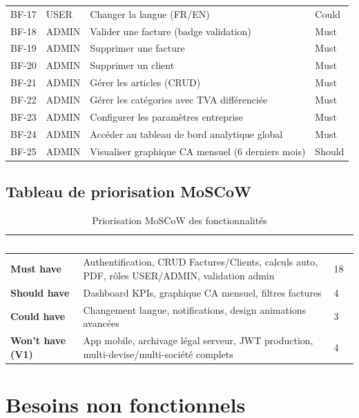 \documentclass[12pt,a4paper]{report}
\begin{document}
\begin{longtable}{|l|l|X|l|}
BF-17 & USER & Changer la langue (FR/EN) & Could \\
BF-18 & ADMIN & Valider une facture (badge validation) & Must \\
BF-19 & ADMIN & Supprimer une facture & Must \\
BF-20 & ADMIN & Supprimer un client & Must \\
BF-21 & ADMIN & Gérer les articles (CRUD) & Must \\
BF-22 & ADMIN & Gérer les catégories avec TVA différenciée & Must \\
BF-23 & ADMIN & Configurer les paramètres entreprise & Must \\
BF-24 & ADMIN & Accéder au tableau de bord analytique global & Must \\
BF-25 & ADMIN & Visualiser graphique CA mensuel (6 derniers mois) & Should \\
\hline
\end{longtable}

\subsection{Tableau de priorisation MoSCoW}

\begin{table}[H]
\centering
\caption{Priorisation MoSCoW des fonctionnalités}
\label{tab:moscow}
\begin{tabularx}{\textwidth}{|l|X|l|}
\hline
\rowcolor{emsiblue}\textcolor{white}{\textbf{Catégorie}} & \textcolor{white}{\textbf{Fonctionnalités}} & \textcolor{white}{\textbf{Nb}} \\
\hline
\textbf{Must have} & Authentification, CRUD Factures/Clients, calculs auto, PDF, rôles USER/ADMIN, validation admin & 18 \\
\textbf{Should have} & Dashboard KPIs, graphique CA mensuel, filtres factures & 4 \\
\textbf{Could have} & Changement langue, notifications, design animations avancées & 3 \\
\textbf{Won't have (V1)} & App mobile, archivage légal serveur, JWT production, multi-devise/multi-société complets & 4 \\
\hline
\end{tabularx}
\end{table}

\section{Besoins non fonctionnels}
\end{document}
